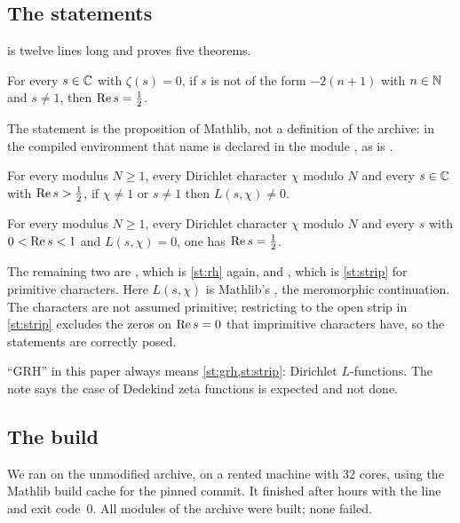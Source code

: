 \subsection{The statements}\label{sec:statements}
 is twelve lines long and proves five theorems.
\begin{statement}\label{st:rh}
For every $s\in\mathbb{C}$ with $\zeta(s)=0$, if $s$ is not of the form $-2(n+1)$ with $n\in\mathbb{N}$ and
$s\neq 1$, then $\operatorname{Re} s=\tfrac12$.
\end{statement}
The statement is the proposition  of Mathlib, not a definition of the
archive: in the compiled environment that name is declared in the module
, as is .
\begin{statement}\label{st:grh}
For every modulus $N\ge 1$, every Dirichlet character $\chi$ modulo $N$ and every $s\in\mathbb{C}$ with
$\operatorname{Re} s>\tfrac12$, if $\chi\neq 1$ or $s\neq1$ then $L(s,\chi)\neq0$.
\end{statement}
\begin{statement}\label{st:strip}
For every modulus $N\ge1$, every Dirichlet character $\chi$ modulo $N$ and every $s$ with
$0<\operatorname{Re} s<1$ and $L(s,\chi)=0$, one has $\operatorname{Re} s=\tfrac12$.
\end{statement}
The remaining two are , which is \cref{st:rh} again, and
, which is \cref{st:strip} for primitive characters.
Here $L(s,\chi)$ is Mathlib's , the meromorphic continuation.
The characters are not assumed primitive; restricting to the open strip in \cref{st:strip}
excludes the zeros on $\operatorname{Re} s=0$ that imprimitive characters have, so the statements are
correctly posed.

``GRH'' in this paper always means \cref{st:grh,st:strip}: Dirichlet $L$-functions. The note
says the case of Dedekind zeta functions is expected and not done.

\subsection{The build}
We ran  on the unmodified archive, on a rented machine with 32 cores,
using the Mathlib build cache for the pinned commit. It finished after \buildhours{} hours
with the line  and exit code~$0$. All
\filecount{} modules of the archive were built; none failed.

